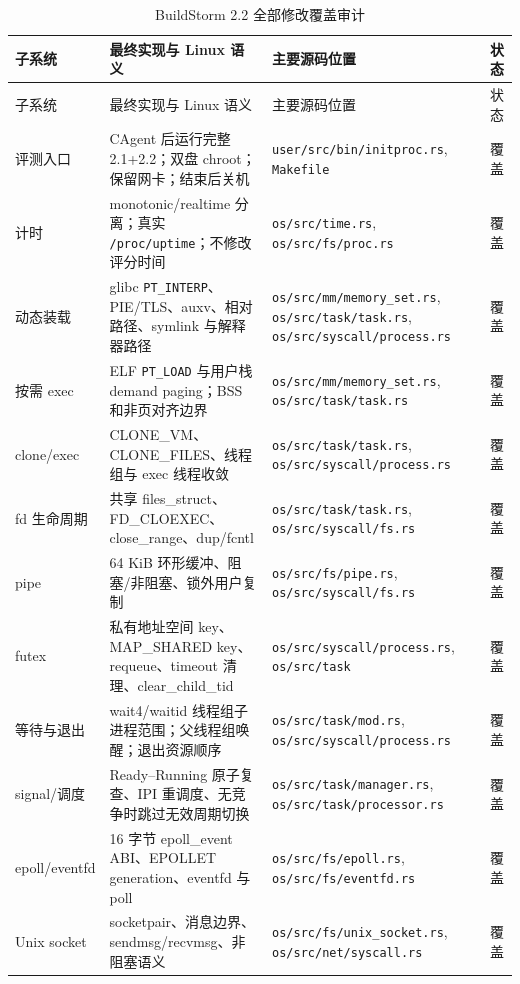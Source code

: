 \documentclass[UTF8,zihao=-4]{ctexart}
\newcommand{\code}{\nolinkurl}
\begin{document}
\begin{longtable}{p{}p{}p{}p{}}
\caption{BuildStorm 2.2 全部修改覆盖审计}\label{tab:coverage}\\
\toprule
子系统 & 最终实现与 Linux 语义 & 主要源码位置 & 状态 \\
\midrule
\endfirsthead
\toprule
子系统 & 最终实现与 Linux 语义 & 主要源码位置 & 状态 \\
\midrule
\endhead
评测入口 & CAgent 后运行完整 2.1+2.2；双盘 chroot；保留网卡；结束后关机 & \code{user/src/bin/initproc.rs}, \code{Makefile} & 覆盖 \\
计时 & monotonic/realtime 分离；真实 \code{/proc/uptime}；不修改评分时间 & \code{os/src/time.rs}, \code{os/src/fs/proc.rs} & 覆盖 \\
动态装载 & glibc \code{PT_INTERP}、PIE/TLS、auxv、相对路径、symlink 与解释器路径 & \code{os/src/mm/memory_set.rs}, \code{os/src/task/task.rs}, \code{os/src/syscall/process.rs} & 覆盖 \\
按需 exec & ELF \code{PT_LOAD} 与用户栈 demand paging；BSS 和非页对齐边界 & \code{os/src/mm/memory_set.rs}, \code{os/src/task/task.rs} & 覆盖 \\
clone/exec & CLONE\_VM、CLONE\_FILES、线程组与 exec 线程收敛 & \code{os/src/task/task.rs}, \code{os/src/syscall/process.rs} & 覆盖 \\
fd 生命周期 & 共享 files\_struct、FD\_CLOEXEC、close\_range、dup/fcntl & \code{os/src/task/task.rs}, \code{os/src/syscall/fs.rs} & 覆盖 \\
pipe & 64 KiB 环形缓冲、阻塞/非阻塞、锁外用户复制 & \code{os/src/fs/pipe.rs}, \code{os/src/syscall/fs.rs} & 覆盖 \\
futex & 私有地址空间 key、MAP\_SHARED key、requeue、timeout 清理、clear\_child\_tid & \code{os/src/syscall/process.rs}, \code{os/src/task} & 覆盖 \\
等待与退出 & wait4/waitid 线程组子进程范围；父线程组唤醒；退出资源顺序 & \code{os/src/task/mod.rs}, \code{os/src/syscall/process.rs} & 覆盖 \\
signal/调度 & Ready--Running 原子复查、IPI 重调度、无竞争时跳过无效周期切换 & \code{os/src/task/manager.rs}, \code{os/src/task/processor.rs} & 覆盖 \\
epoll/eventfd & 16 字节 epoll\_event ABI、EPOLLET generation、eventfd 与 poll & \code{os/src/fs/epoll.rs}, \code{os/src/fs/eventfd.rs} & 覆盖 \\
Unix socket & socketpair、消息边界、sendmsg/recvmsg、非阻塞语义 & \code{os/src/fs/unix_socket.rs}, \code{os/src/net/syscall.rs} & 覆盖 \\

\end{longtable}
\end{document}
